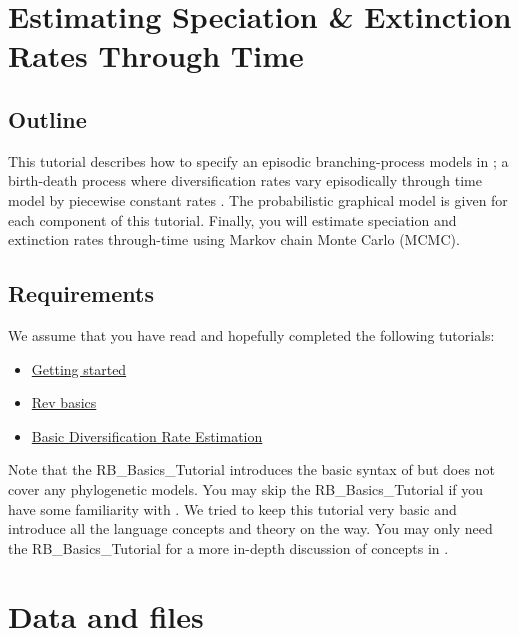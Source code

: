 \section{Estimating Speciation \& Extinction Rates Through Time}

\subsection{Outline}

This tutorial describes how to specify an episodic branching-process models in \RevBayes;
a birth-death process where diversification rates vary episodically through time model by piecewise constant rates \citep{Stadler2011,Hoehna2015a}.
The probabilistic graphical model is given for each component of this tutorial.
Finally, you will estimate speciation and extinction rates through-time using Markov chain Monte Carlo (MCMC).


\subsection{Requirements}
We assume that you have read and hopefully completed the following tutorials:
\begin{itemize}
\item \href{https://github.com/revbayes/revbayes_tutorial/raw/master/tutorial_TeX/RB_Getting_Started/RB_Getting_Started.pdf}{Getting started}
\item \href{https://github.com/revbayes/revbayes_tutorial/raw/master/tutorial_TeX/RB_Basics_Tutorial/RB_Basics_Tutorial.pdf}{Rev basics}
\item \href{https://github.com/revbayes/revbayes_tutorial/raw/master/tutorial_TeX/RB_DiversificationRate_Tutorial/RB_DiversificationRate_Tutorial.pdf}{Basic Diversification Rate Estimation}
\end{itemize}
Note that the RB\_Basics\_Tutorial introduces the basic syntax of \Rev but does not cover any phylogenetic models.
You may skip the RB\_Basics\_Tutorial if you have some familiarity with \R.
We tried to keep this tutorial very basic and introduce all the language concepts and theory on the way.
You may only need the RB\_Basics\_Tutorial for a more in-depth discussion of concepts in \Rev.


\section{Data and files}

